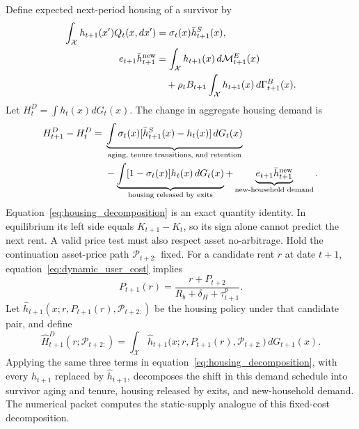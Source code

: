 \documentclass[11pt]{article}
\theoremstyle{definition}
\newcommand{\1}{\mathbf 1}
\newcommand{\X}{\mathcal X}
\begin{document}
Define expected next-period housing of a survivor by
\begin{equation}
 \begin{aligned}
 \int_{\X}h_{t+1}(x')Q_t(x,dx')
 &=\sigma_t(x)\bar h^S_{t+1}(x),\\
 e_{t+1}\bar h^{\rm new}_{t+1}
 &=\int_{\X}h_{t+1}(x)\,d\mathcal M^E_{t+1}(x)\\
 &\quad+\rho_tB_{t+1}\int_{\X}h_{t+1}(x)\,d\Gamma^B_{t+1}(x).
 \end{aligned}
 \label{eq:survivor_entrant_housing}
\end{equation}
Let $H_t^D=\int h_t(x)dG_t(x)$. The change in aggregate housing demand is
\begin{equation}
\begin{aligned}
 H_{t+1}^D-H_t^D
={}&\underbrace{\int\sigma_t(x)
 [\bar h^S_{t+1}(x)-h_t(x)]\,dG_t(x)}_{
 \text{aging, tenure transitions, and retention}}\\
&-\underbrace{\int[1-\sigma_t(x)]h_t(x)\,dG_t(x)}_{
 \text{housing released by exits}}
+\underbrace{e_{t+1}\bar h^{\rm new}_{t+1}}_{
 \text{new-household demand}}.
\end{aligned}
\label{eq:housing_decomposition}
\end{equation}
Equation~\eqref{eq:housing_decomposition} is an exact quantity identity. In
equilibrium its left side equals $K_{t+1}-K_t$, so its sign alone cannot predict
the next rent. A valid price test must also respect asset no-arbitrage. Hold the
continuation asset-price path $\mathcal P_{t+2:}$ fixed. For a candidate rent
$r$ at date $t+1$, equation~\eqref{eq:dynamic_user_cost} implies
\begin{equation}
 P_{t+1}(r)=
 \frac{r+P_{t+2}}{R_b+\delta_H+\tau^p_{t+1}}.
 \label{eq:candidate_asset_price}
\end{equation}
Let $\widehat h_{t+1}(x;r,P_{t+1}(r),\mathcal P_{t+2:})$ be the housing policy
under that candidate pair, and define
\begin{equation}
 \widehat H^D_{t+1}(r;\mathcal P_{t+2:})
 =\int_{\X}\widehat h_{t+1}
 \bigl(x;r,P_{t+1}(r),\mathcal P_{t+2:}\bigr)\,dG_{t+1}(x).
 \label{eq:old_rent_demand}
\end{equation}
Applying the same three terms in equation~\eqref{eq:housing_decomposition},
with every $h_{t+1}$ replaced by $\widehat h_{t+1}$, decomposes the shift in
this demand schedule into survivor aging and tenure, housing released by exits,
and new-household demand. The numerical packet computes the static-supply
analogue of this fixed-cost decomposition.
\end{document}
